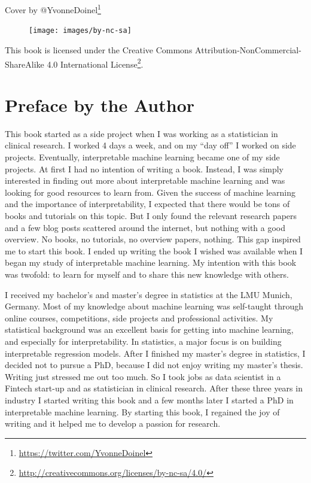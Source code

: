 \documentclass[12pt,]{krantz}
\renewcommand{\href}[2]{#2\footnote{\url{#1}}}
\begin{document}
Cover by \href{https://twitter.com/YvonneDoinel}{@YvonneDoinel}

\begin{figure}

{\centering \texttt{[image: images/by-nc-sa]} 

}

\end{figure}

This book is licensed under the
\href{http://creativecommons.org/licenses/by-nc-sa/4.0/}{Creative
Commons Attribution-NonCommercial-ShareAlike 4.0 International License}.

\chapter{Preface by the Author}\label{preface-by-the-author}

This book started as a side project when I was working as a statistician
in clinical research. I worked 4 days a week, and on my ``day off'' I
worked on side projects. Eventually, interpretable machine learning
became one of my side projects. At first I had no intention of writing a
book. Instead, I was simply interested in finding out more about
interpretable machine learning and was looking for good resources to
learn from. Given the success of machine learning and the importance of
interpretability, I expected that there would be tons of books and
tutorials on this topic. But I only found the relevant research papers
and a few blog posts scattered around the internet, but nothing with a
good overview. No books, no tutorials, no overview papers, nothing. This
gap inspired me to start this book. I ended up writing the book I wished
was available when I began my study of interpretable machine learning.
My intention with this book was twofold: to learn for myself and to
share this new knowledge with others.

I received my bachelor's and master's degree in statistics at the LMU
Munich, Germany. Most of my knowledge about machine learning was
self-taught through online courses, competitions, side projects and
professional activities. My statistical background was an excellent
basis for getting into machine learning, and especially for
interpretability. In statistics, a major focus is on building
interpretable regression models. After I finished my master's degree in
statistics, I decided not to pursue a PhD, because I did not enjoy
writing my master's thesis. Writing just stressed me out too much. So I
took jobs as data scientist in a Fintech start-up and as statistician in
clinical research. After these three years in industry I started writing
this book and a few months later I started a PhD in interpretable
machine learning. By starting this book, I regained the joy of writing
and it helped me to develop a passion for research.
\end{document}
